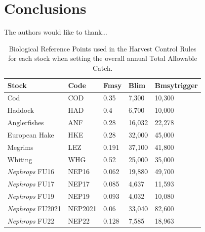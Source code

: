 \documentclass[12pt, halfline, a4paper]{ouparticle}
\begin{document}
\section{Conclusions}
\label{con}


\begin{notes}[Acknowledgements]
The authors would like to thank...
\end{notes}




\clearpage

\begin{table}
	\center
	\begin{tabular}{p{4cm} p{3cm} p{2cm} p{2cm} p{2cm}}
		\toprule
		Stock & Code & Fmsy & Blim & Bmsytrigger \\
		\hline
		Cod & COD & 0.35 & 7,300  & 10,300 \\
		Haddock & HAD & 0.4 & 6,700 & 10,000 \\
		Anglerfishes & ANF & 0.28 & 16,032 & 22,278 \\
		European Hake & HKE & 0.28 & 32,000 & 45,000 \\
		Megrims & LEZ & 0.191 & 37,100 & 41,800 \\
		Whiting & WHG & 0.52 & 25,000 & 35,000 \\
		\textit{Nephrops} FU16 & NEP16 & 0.062 & 19,880 & 49,700 \\
		\textit{Nephrops} FU17 & NEP17 & 0.085 & 4,637 & 11,593 \\
	        \textit{Nephrops} FU19 & NEP19 & 0.093 & 4,032 & 10,080 \\
		\textit{Nephrops} FU2021 & NEP2021 & 0.06 & 33,040 & 82,600 \\
		\textit{Nephrops} FU22 & NEP22 & 0.128 & 7,585 & 18,963 \\
		\bottomrule
	\end{tabular}
	\label{tab:brp}
	\caption{Biological Reference Points used in the Harvest Control Rules for each
		stock when setting the overall annual Total Allowable Catch.}
\end{table}

\clearpage
\end{document}
